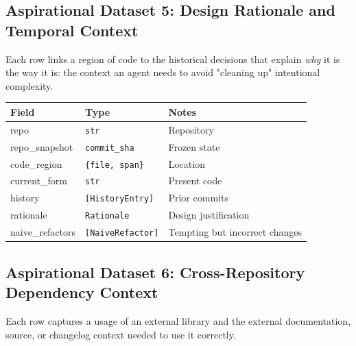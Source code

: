 \documentclass[a4paper,12pt]{article}
\begin{document}
\subsection*{Aspirational Dataset 5: Design Rationale and Temporal Context}

\noindent Each row links a region of code to the historical decisions that explain \textit{why} it is the way it is: the context an agent needs to avoid "cleaning up" intentional complexity.

\begin{tcolorbox}[title=CodeHistory]
\footnotesize
\begin{tabularx}{\linewidth}{@{} l l Y @{}}
\toprule
\textbf{Field} & \textbf{Type} & \textbf{Notes} \\
\midrule
repo & \texttt{str} & Repository \\
repo\_snapshot & \texttt{commit\_sha} & Frozen state \\
code\_region & \texttt{\{file, span\}} & Location \\
current\_form & \texttt{str} & Present code \\
history & \texttt{[HistoryEntry]} & Prior commits \\
rationale & \texttt{Rationale} & Design justification \\
naive\_refactors & \texttt{[NaiveRefactor]} & Tempting but incorrect changes \\
\bottomrule
\end{tabularx}
\end{tcolorbox}

\subsection*{Aspirational Dataset 6: Cross-Repository Dependency Context}

\noindent Each row captures a usage of an external library and the external documentation, source, or changelog context needed to use it correctly.
\end{document}

